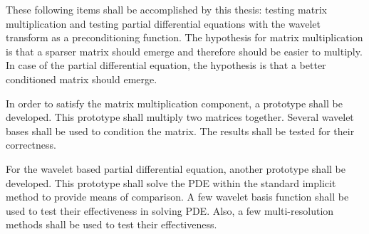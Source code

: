 These following items shall be accomplished by this thesis:  testing matrix multiplication and testing partial differential equations with the wavelet transform as a preconditioning function.  The hypothesis for matrix multiplication is that a sparser matrix should emerge and therefore should be easier to multiply.  In case of the partial differential equation, the hypothesis is that  a better conditioned matrix should emerge.

In order to satisfy the matrix multiplication component, a prototype shall be developed.  This prototype shall multiply two matrices together.  Several wavelet bases shall be used to condition the matrix.  The results shall be tested for their correctness.  

For the wavelet based partial differential equation, another prototype shall be developed.  This prototype shall solve the PDE within the standard implicit method to provide means of comparison.  A few wavelet basis function shall be used to test their effectiveness in solving PDE.  Also, a few multi-resolution methods shall be used to test their effectiveness.  

